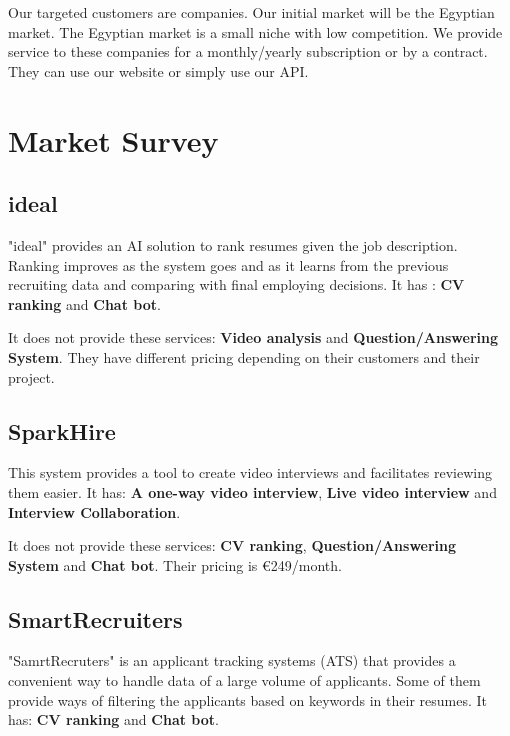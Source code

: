 Our targeted customers are companies. Our initial market will be the Egyptian market. The Egyptian market is a small niche with low competition. We provide service to these companies for a monthly/yearly subscription or by a contract. They can use our website or simply use our API. 

\section{Market Survey}

\subsection{ideal}
"ideal" provides an AI solution to rank resumes given the job description. Ranking improves as the system goes and as it learns from the previous recruiting data and comparing with final employing decisions. It has : \textbf{CV ranking} and \textbf{Chat bot}.\newline

It does not provide these services: \textbf{Video analysis} and \textbf{Question/Answering System}.
They have different pricing depending on their customers and their project.

\subsection{SparkHire}
This system provides a tool to create video interviews and facilitates reviewing them easier. It has: \textbf{A one-way video interview},  \textbf{Live video interview} and \textbf{Interview Collaboration}.\newline

It does not provide these services:
\textbf{CV ranking}, \textbf{Question/Answering System} and \textbf{Chat bot}.
Their pricing is €249/month.\cite{SparkHire Pricing}

\subsection{SmartRecruiters}
"SamrtRecruters" is an applicant tracking systems (ATS) that provides a convenient way to handle data of a large volume of applicants. Some of them provide ways of filtering the applicants based on keywords in their resumes. It has: \textbf{CV ranking} and \textbf{Chat bot}. \newline

